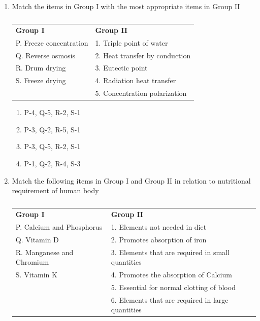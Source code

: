 \documentclass[a4paper,10pt]{article}
\begin{document}
\begin{enumerate}
\begin{multicols}{4}
\begin{enumerate}
\item 20.67
\item 40.00
\item 59.99
\item 66.67
\end{enumerate}
\end{multicols}

\item Match the items in Group I with the most appropriate items in Group II
\begin{table}[H]
\centering
\begin{tabular}{ll}
\textbf{Group I} & \textbf{Group II} \\
P. Freeze concentration & 1. Triple point of water \\
Q. Reverse osmosis & 2. Heat transfer by conduction \\
R. Drum drying & 3. Eutectic point \\
S. Freeze drying & 4. Radiation heat transfer \\
 & 5. Concentration polarization \\
\end{tabular}
\caption*{}
\label{tab:q11_food}
\end{table}
\hfill{}

\begin{multicols}{2}
\begin{enumerate}
\item P-4, Q-5, R-2, S-1
\item P-3, Q-2, R-5, S-1
\item P-3, Q-5, R-2, S-1
\item P-1, Q-2, R-4, S-3
\end{enumerate}
\end{multicols}

\item Match the following items in Group I and Group II in relation to nutritional requirement of human body
\begin{table}[H]
\centering
\begin{tabular}{ll}
\textbf{Group I} & \textbf{Group II} \\
P. Calcium and Phosphorus & 1. Elements not needed in diet \\
Q. Vitamin D & 2. Promotes absorption of iron \\
R. Manganese and Chromium & 3. Elements that are required in small quantities \\
S. Vitamin K & 4. Promotes the absorption of Calcium \\
 & 5. Essential for normal clotting of blood \\
 & 6. Elements that are required in large quantities \\
\end{tabular}
\caption*{}
\label{tab:q12_food}
\end{table}
\hfill{}


\end{enumerate}
\end{document}
